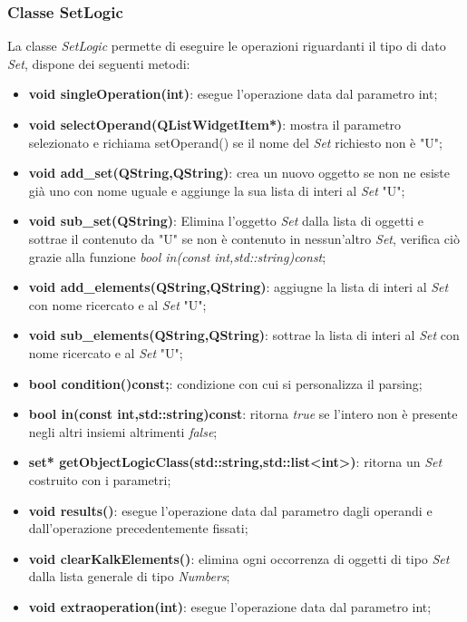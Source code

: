\documentclass[a4paper,10pt]{article}
\begin{document}
        \subsubsection{Classe SetLogic}
        La classe \textit{SetLogic} permette di eseguire le operazioni riguardanti il tipo di dato \textit{Set}, dispone dei seguenti metodi:
        \begin{itemize}
            \item \textbf{void singleOperation(int)}: esegue l'operazione data dal parametro int;
            \item \textbf{void selectOperand(QListWidgetItem*)}: mostra il parametro selezionato e richiama setOperand() se il nome del \textit{Set} richiesto non è "U";
            \item \textbf{void add\_set(QString,QString)}: crea un nuovo oggetto se non ne esiste già uno con nome uguale e aggiunge la sua lista di interi al \textit{Set} "U";
            \item \textbf{void sub\_set(QString)}: Elimina l'oggetto \textit{Set} dalla lista di oggetti e sottrae il contenuto da "U" se non è contenuto in nessun'altro \textit{Set}, verifica ciò grazie alla funzione \textit{bool in(const int,std::string)const};
            \item \textbf{void add\_elements(QString,QString)}: aggiugne la lista di interi al \textit{Set} con nome ricercato e al \textit{Set} "U";
            \item \textbf{void sub\_elements(QString,QString)}: sottrae la lista di interi al \textit{Set} con nome ricercato e al \textit{Set} "U";
            \item \textbf{bool condition()const;}: condizione con cui si personalizza il parsing;
            \item \textbf{bool in(const int,std::string)const}: ritorna \textit{true} se l'intero non è presente negli altri insiemi altrimenti \textit{false};
            \item \textbf{set* getObjectLogicClass(std::string,std::list<int>)}: ritorna un \textit{Set} costruito con i parametri;
            \item \textbf{void results()}: esegue l'operazione data dal parametro dagli operandi e dall'operazione precedentemente fissati;
            \item \textbf{void clearKalkElements()}: elimina ogni occorrenza di oggetti di tipo \textit{Set} dalla lista generale di tipo \textit{Numbers};
            \item \textbf{void extraoperation(int)}: esegue l'operazione data dal parametro int;
        \end{itemize}
\end{document}
